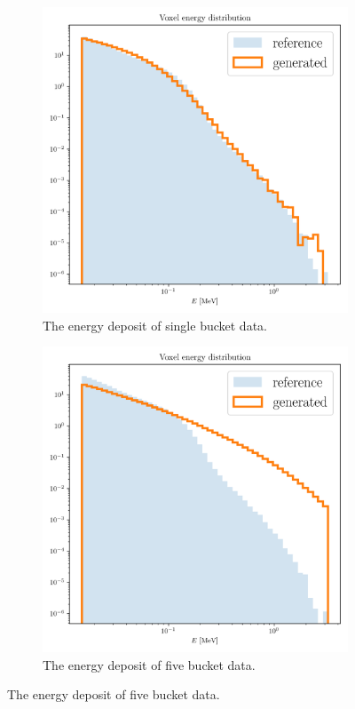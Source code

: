 \begin{figure}[htbp]
    \centering
    \begin{subfigure}[b]{0.45\textwidth} %
        \includegraphics[width=\textwidth]{Figures/energy_voxel_single.png}
        \caption{The energy deposit of single bucket data.}
        \label{fig:single_bucket}
    \end{subfigure}
    \hfill %
    \begin{subfigure}[b]{0.45\textwidth}
        \includegraphics[width=\textwidth]{Figures/energy_voxel_full.png}
        \caption{The energy deposit of five bucket data.}
        \label{fig:all_bucket}
    \end{subfigure}
    

\end{figure}
